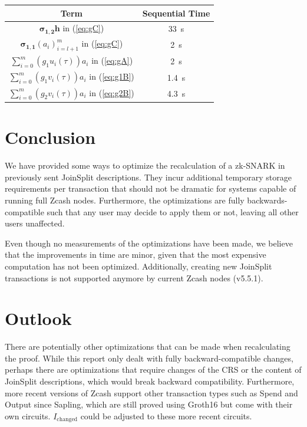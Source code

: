 \documentclass{article}
\begin{document}
\begin{center}
\begin{tabular}{ c c }
        Term & Sequential Time \\
        \hline
        $\boldsymbol{\sigma_{1,2}}\boldsymbol{h}$ in (\ref{eq:gC}) & \SI{33}{\second} \\
        $\boldsymbol{\sigma_{1,1}}(a_i)_{i=l+1}^m$ in (\ref{eq:gC}) & \SI{2}{\second} \\
        $\sum_{i=0}^m(g_1u_i(\tau))a_i$ in (\ref{eq:gA}) & \SI{2}{\second} \\
        $\sum_{i=0}^m(g_1v_i(\tau))a_i$ in (\ref{eq:g1B}) & \SI{1.4}{\second} \\
        $\sum_{i=0}^m(g_2v_i(\tau))a_i$ in (\ref{eq:g2B}) & \SI{4.3}{\second}
\end{tabular}
\end{center}

\section{Conclusion}

We have provided some ways to optimize the recalculation of a zk-SNARK in previously sent JoinSplit descriptions.
They incur additional temporary storage requirements per transaction that should not be dramatic for systems capable of running full Zcash nodes.
Furthermore, the optimizations are fully backwards-compatible such that any user may decide to apply them or not, leaving all other users unaffected.

Even though no measurements of the optimizations have been made, we believe that the improvements in time are minor, given that the most expensive
computation has not been optimized.
Additionally, creating new JoinSplit transactions is not supported anymore by current Zcash nodes (v5.5.1).

\section{Outlook}

There are potentially other optimizations that can be made when recalculating the proof.
While this report only dealt with fully backward-compatible changes, perhaps there are optimizations that require changes of the CRS or the content of JoinSplit descriptions, which would break backward compatibility.
Furthermore, more recent versions of Zcash support other transaction types such as Spend and Output since Sapling, which are still proved using Groth16 but come with their own circuits.
$I_\text{changed}$ could be adjusted to these more recent circuits.
\end{document}
